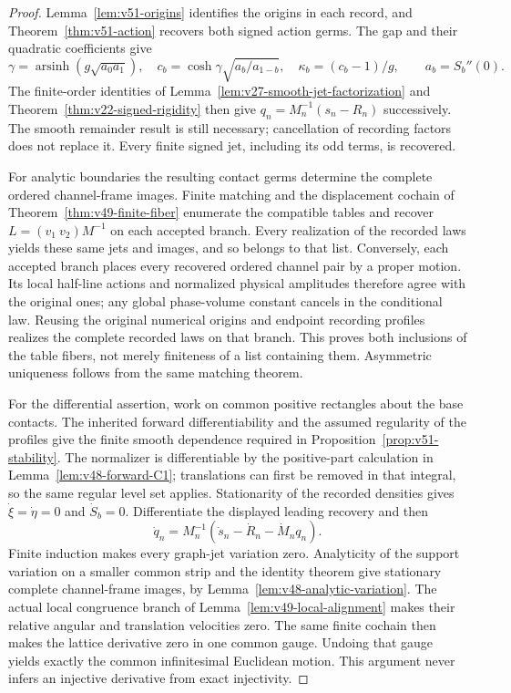 \begin{proof}
Lemma~\ref{lem:v51-origins} identifies the origins in each record, and
Theorem~\ref{thm:v51-action} recovers both signed action germs.  The gap
and their quadratic coefficients give
\[
 \gamma=\operatorname{arsinh}(g\sqrt{a_0a_1}),\quad
 c_b=\cosh\gamma\sqrt{a_b/a_{1-b}},\quad
 \kappa_b=(c_b-1)/g,\qquad a_b=S_b''(0).
\]
The finite-order identities of
Lemma~\ref{lem:v27-smooth-jet-factorization} and
Theorem~\ref{thm:v22-signed-rigidity} then give
$q_n=M_n^{-1}(s_n-R_n)$ successively.  The smooth remainder result is
still necessary; cancellation of recording factors does not replace it.
Every finite signed jet, including its odd terms, is recovered.

For analytic boundaries the resulting contact germs determine the complete
ordered channel-frame images.  Finite matching and the displacement cochain
of Theorem~\ref{thm:v49-finite-fiber} enumerate the compatible tables and
recover $L=(v_1\ v_2)M^{-1}$ on each accepted branch.  Every realization
of the recorded laws yields these same jets and images, and so belongs
to that list.  Conversely, each accepted branch places every recovered
ordered channel pair by a proper motion.  Its local half-line actions and
normalized physical amplitudes therefore agree with the original ones;
any global phase-volume constant cancels in the conditional law.  Reusing
the original numerical origins and endpoint recording profiles realizes
the complete recorded laws on that branch.  This proves both inclusions
of the table fibers, not merely finiteness of a list containing them.
Asymmetric uniqueness follows from the same matching theorem.

For the differential assertion, work on common positive rectangles about
the base contacts.  The inherited forward differentiability and the assumed
regularity of the profiles give the finite smooth dependence required in
Proposition~\ref{prop:v51-stability}.  The normalizer is differentiable by
the positive-part calculation in Lemma~\ref{lem:v48-forward-C1}; translations
can first be removed in that integral, so the same regular level set applies.
Stationarity of the recorded densities gives $\dot\xi=\dot\eta=0$ and
$\dot S_b=0$.  Differentiate the displayed leading recovery and then
\[
 \dot q_n=M_n^{-1}(\dot s_n-\dot R_n-\dot M_nq_n).
\]
Finite induction makes every graph-jet variation zero.  Analyticity of the
support variation on a smaller common strip and the identity theorem give
stationary complete channel-frame images, by
Lemma~\ref{lem:v48-analytic-variation}.  The actual local congruence branch
of Lemma~\ref{lem:v49-local-alignment} makes their relative angular and
translation velocities zero.  The same finite cochain then makes the
lattice derivative zero in one common gauge.  Undoing that gauge yields
exactly the common infinitesimal Euclidean motion.  This argument never
infers an injective derivative from exact injectivity.


\end{proof}
